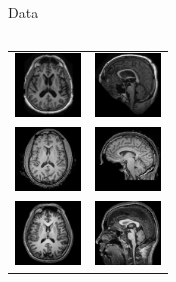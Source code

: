 \documentclass[xcolor=dvipsnames,serif,10pt]{beamer}
\begin{document}
\begin{frame}{Data}
\begin{columns}[c]
\begin{column}[c]{0.4\textwidth}
\begin{tabular}{cc}
     \vspace{-0.05cm}
     \includegraphics[width=1.75cm]{OAS1_0039_axial.png} &  
     \includegraphics[width=1.75cm]{OAS1_0039_sag.png} \\
     \vspace{-0.05cm}
     \includegraphics[width=1.75cm]{NKI_2861923_axial.png} &  
     \includegraphics[width=1.75cm]{NKI_2861923_sag.png} \\
     \vspace{-0.05cm}
     \includegraphics[width=1.75cm]{KKI2009-25_axial.png} &  
     \includegraphics[width=1.75cm]{KKI2009-25_sag.png} 
   \end{tabular}
 \end{column}
\end{columns}

\end{frame}
  
\end{document}
